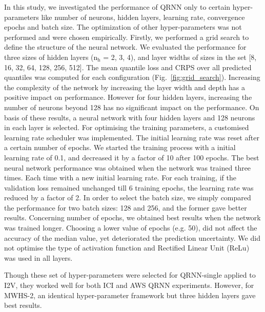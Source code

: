\documentclass[amt, manuscript]{copernicus}
\begin{document}
In this study, we investigated the performance of QRNN only to certain hyper-parameters like number of neurons, hidden layers, learning rate, convergence epochs and batch size. The optimization of other hyper-parameters was not performed and were chosen empirically. Firstly, we performed a grid search to define the structure of the neural network. We evaluated the performance for three sizes of hidden layers ($\mathrm{n_h}$ = 2, 3, 4), and layer widths of sizes in the set [8, 16, 32, 64, 128, 256, 512]. The mean quantile loss and CRPS over all predicted quantiles was computed for each configuration (Fig.~\ref{fig:grid_search}). Increasing the complexity of the network by increasing the layer width and depth has a positive impact on performance. However for four hidden layers, increasing the number of neurons beyond 128 has no significant impact on the performance. On basis of these results, a neural network with four hidden layers and 128 neurons in each layer is selected. For optimising the training parameters, a customised  learning rate scheduler was implemented. The initial learning rate was reset after a certain number of epochs.  We started the training process with a initial learning rate of 0.1, and decreased it by a factor of 10 after 100 epochs. The best neural network performance was obtained when the network was trained three times. Each time with a new initial learning rate. For each training, if the validation loss remained unchanged till 6 training epochs, the learning rate was reduced by a factor of 2. 
In order to select the batch size, we simply compared the performance for two batch sizes: 128 and 256, and the former gave better results. Concerning number of epochs, we obtained best results when the network was trained longer. Choosing a lower value of epochs (e.g. 50), did not affect the accuracy of the median value, yet deteriorated the prediction uncertainty. We did not optimise the type of activation function and Rectified Linear Unit (ReLu) was used in all layers. 

Though these set of hyper-parameters were selected for QRNN-single applied to I2V, they worked well for both ICI and AWS QRNN experiments. However, for MWHS-2, an identical hyper-parameter framework but three hidden layers gave best results.  




\noappendix       %
\end{document}
